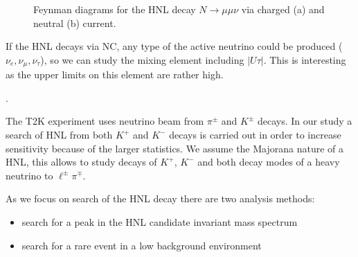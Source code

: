 \documentclass[../main.tex]{subfiles}
\begin{document}
\begin{figure}[!ht]
    \begin{minipage}[!ht]{0.49\linewidth}
    \end{minipage}
    \hfill
    \begin{minipage}[!ht]{0.49\linewidth}
    \end{minipage}
    \caption{Feynman diagrams for the HNL decay $N\to\mu\mu\nu$ via charged (a) and neutral (b) current.}
    \label{fig:DimuonFeynman}
\end{figure}

If the HNL decays via NC, any type of the active neutrino could be produced ($\nu_{e}, \nu_{\mu}, \nu_{\tau}$), so we can study the mixing element including $|U\tau|$. This is interesting as the upper limits on this element are rather high.

.

The T2K experiment uses neutrino beam from $\pi^\pm$ and $K^\pm$ decays. In our study a search of HNL from both $K^+$ and $K^-$ decays is carried out in order to increase sensitivity because of the larger statistics. We assume the Majorana nature of a HNL, this allows to study decays of $K^+$, $K^-$ and both decay modes of a heavy neutrino to $\ell^{\pm}\pi^{\mp}$.

As we focus on search of the HNL decay there are two analysis methods:
\begin{itemize}
  \item search for a peak in the HNL candidate invariant mass spectrum
  \item search for a rare event in a low background environment
\end{itemize}
\end{document}
